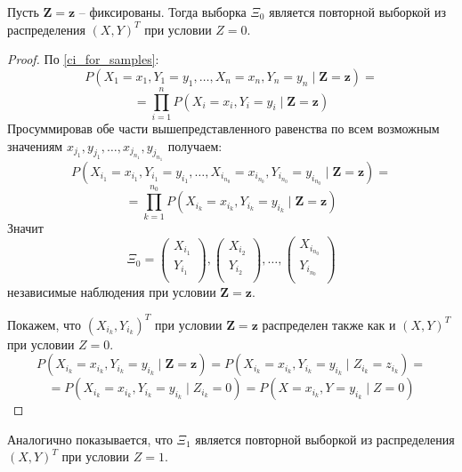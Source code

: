 \begin{theorem}
    Пусть $\mathbf{Z}=\mathbf{z}$ -- фиксированы. Тогда выборка $\Xi_0$ является повторной выборкой из распределения $(X,Y)^T$ при условии $Z=0$.
\end{theorem}
\begin{proof}
    По \autoref{ci_for_samples}:
    $$
    P(X_1=x_1,Y_1=y_1,\ldots,X_n=x_n,Y_n=y_n \mid \mathbf{Z}=\mathbf{z})=
    $$
    $$
    =\prod_{i=1}^n P(X_i=x_i, Y_i=y_i \mid \mathbf{Z}=\mathbf{z})
    $$
    Просуммировав обе части вышепредставленного равенства по всем возможным значениям 
    $x_{j_1}, y_{j_1}, \ldots, x_{j_{n_1}},y_{j_{n_1}}$ получаем:
    $$
    P(X_{i_1}=x_{i_1},Y_{i_1}=y_{i_1},\ldots,X_{i_{n_0}}=x_{i_{n_0}},Y_{i_{n_0}}=y_{i_{n_0}} \mid \mathbf{Z}=\mathbf{z})=
    $$
    $$
    =\prod_{k=1}^{n_0} P(X_{i_k}=x_{i_k}, Y_{i_k}=y_{i_k} \mid \mathbf{Z}=\mathbf{z})
    $$
    Значит $$
    \Xi_0=
    \begin{pmatrix}
        X_{i_1} \\
        Y_{i_1} \\
    \end{pmatrix},
    \begin{pmatrix}
        X_{i_2} \\
        Y_{i_2} \\
    \end{pmatrix}, \ldots,
    \begin{pmatrix}
        X_{i_{n_0}} \\
        Y_{i_{n_0}} \\
    \end{pmatrix} 
    $$
    независимые наблюдения при условии $\mathbf{Z}=\mathbf{z}$.

    Покажем, что $(X_{i_k},Y_{i_k})^T$ при условии $\mathbf{Z}=\mathbf{z}$ распределен также как и 
    $(X,Y)^T$ при условии $Z=0$.
    $$
    P(X_{i_k}=x_{i_k}, Y_{i_k}=y_{i_k} \mid \mathbf{Z}=\mathbf{z}) =
    P(X_{i_k}=x_{i_k}, Y_{i_k}=y_{i_k} \mid Z_{i_k}=z_{i_k}) = $$
    $$=P(X_{i_k}=x_{i_k}, Y_{i_k}=y_{i_k} \mid Z_{i_{k}}=0)=
    P(X=x_{i_k}, Y=y_{i_k} \mid Z=0)$$
\end{proof}

Аналогично показывается, что $\Xi_1$ является повторной выборкой из распределения $(X,Y)^T$ при условии $Z=1$.

